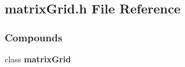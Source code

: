 \subsection{matrix\-Grid.h File Reference}
\label{matrixGrid.h}
\subsubsection*{Compounds}
\begin{CompactItemize}
\item 
class {\bf matrix\-Grid}
\end{CompactItemize}
